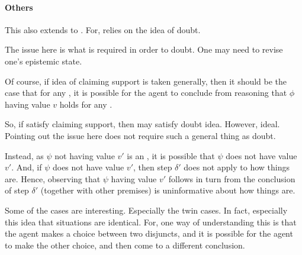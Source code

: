 \paragraph{Others}

\begin{note}
  This also extends to \citeauthor{Wright:2011wn}.
  For, \citeauthor{Wright:2011wn} relies on the idea of doubt.

  The issue here is what is required in order to doubt.
  One may need to revise one's epistemic state.

  Of course, if idea of claiming support is taken generally, then it should be the case that for any \epPW{}, it is possible for the agent to conclude from reasoning that \(\phi\) having value \(v\) holds for any \epVAd{} \world{}.

  So, if satisfy claiming support, then may satisfy doubt idea.
  However, ideal.
  Pointing out the issue here does not require such a general thing as doubt.
\end{note}

\begin{note}
  Instead, as \(\psi\) not having value \(v'\) is an \ep{}, it is possible that \(\psi\) does not have value \(v'\).
  And, if \(\psi\) does not have value \(v'\), then step \(\delta'\) does not apply to how things are.
  Hence, observing that \(\psi\) having value \(v'\) follows in turn from the conclusion of step \(\delta'\) (together with other premises) is uninformative about how things are.
\end{note}

\begin{note}
  \color{red}
  Some of the \citeauthor{Wright:2011wn} cases are interesting.
  Especially the twin cases.
  In fact, especially this idea that situations are identical.
  For, one way of understanding this is that the agent makes a choice between two disjuncts, and it is possible for the agent to make the other choice, and then come to a different conclusion.
\end{note}

